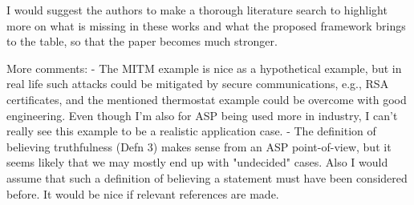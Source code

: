 I would suggest the authors to make a thorough literature search to highlight more on what is missing in these works and what the proposed framework brings to the table, so that the paper becomes much stronger.


More comments:
- The MITM example is nice as a hypothetical example, but in real life such attacks could be mitigated by secure communications, e.g., RSA certificates, and the mentioned thermostat example could be overcome with good engineering. Even though I'm also for ASP being used more in industry, I can't really see this example to be a realistic application case.
- The definition of believing truthfulness (Defn 3) makes sense from an ASP point-of-view, but it seems likely that we may mostly end up with "undecided" cases. Also I would assume that such a definition of believing a statement must have been considered before. It would be nice if relevant references are made.
